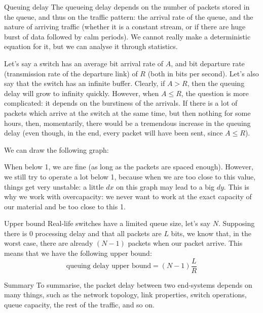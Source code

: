 \documentclass[a4paper]{article}
\begin{document}
\begin{parag}{Queuing delay}
    The queueing delay depends on the number of packets stored in the queue, and thus on the traffic pattern: the arrival rate of the queue, and the nature of arriving traffic (whether it is a constant stream, or if there are huge burst of data followed by calm periods). We cannot really make a deterministic equation for it, but we can analyse it through statistics.

    Let's say a switch has an average bit arrival rate of $A$, and bit departure rate (transmission rate of the departure link) of $R$ (both in bits per second). Let's also say that the switch has an infinite buffer. Clearly, if $A > R$, then the queuing delay will grow to infinity quickly. However, when $A \leq R$, the question is more complicated: it depends on the burstiness of the arrivals. If there is a lot of packets which arrive at the switch at the same time, but then nothing for some hours, then, momentarily, there would be a tremendous increase in the queuing delay (even though, in the end, every packet will have been sent, since $A \leq R$).

    We can draw the following graph:

    When below 1, we are fine (as long as the packets are spaced enough). However, we still try to operate a lot below 1, because when we are too close to this value, things get very unstable: a little $dx$ on this graph may lead to a big $dy$. This is why we work with overcapacity: we never want to work at the exact capacity of our material and be too close to this 1.

    \begin{subparag}{Upper bound}
        Real-life switches have a limited queue size, let's say $N$. Supposing there is 0 processing delay and that all packets are $L$ bits, we know that, in the worst case, there are already $\left(N-1\right)$ packets when our packet arrive. This means that we have the following upper bound:
        \[\text{queuing delay upper bound} = \left(N - 1\right) \frac{L}{R}\]
    \end{subparag}
\end{parag}

\begin{parag}{Summary}
    To summarise, the packet delay between two end-systems depends on many things, such as the network topology, link properties, switch operations, queue capacity, the rest of the traffic, and so on.
\end{parag}
\end{document}
